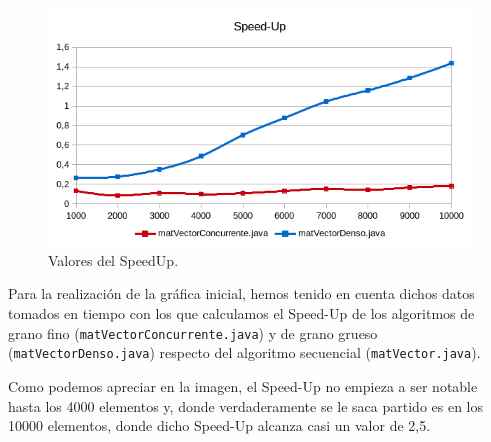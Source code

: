 \documentclass[12pt,letterpaper]{article}
\begin{document}
\begin{figure}[h]
	\begin{center}
				\includegraphics[scale=1]{SpeedUp1.png}
		\caption{Valores del SpeedUp.}
		\label{fig:Valores del SpeedUp}
	\end{center}
\end{figure}
Para la realización de la gráfica inicial, hemos tenido en cuenta dichos datos tomados en tiempo con los que calculamos el Speed-Up de los algoritmos de grano fino (\texttt{matVectorConcurrente.java}) y de grano grueso (\texttt{matVectorDenso.java}) respecto del algoritmo secuencial (\texttt{matVector.java}).

Como podemos apreciar en la imagen, el Speed-Up no empieza a ser notable hasta los 4000 elementos y, donde verdaderamente se le saca partido es en los 10000 elementos, donde dicho Speed-Up alcanza casi un valor de 2,5.

	
\end{document}
